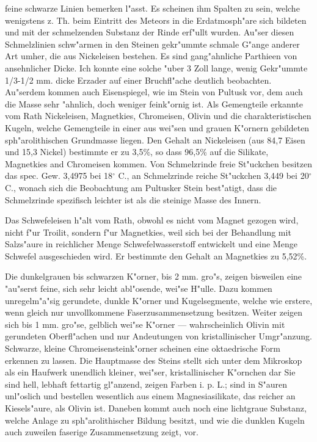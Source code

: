 \documentclass[a4paper, 11pt, oneside]{article}
\begin{document}
feine schwarze Linien bemerken l"asst. Es scheinen ihm Spalten zu sein, welche wenigstens z. Th. beim Eintritt des Meteors in die Erdatmosph"are sich bildeten und mit der schmelzenden Substanz der Rinde erf"ullt wurden. Au"ser diesen Schmelzlinien schw"armen in den Steinen gekr"ummte schmale G"ange anderer Art umher, die aus Nickeleisen bestehen. Es sind gang"ahnliche Parthieen von ansehnlicher Dicke. Ich konnte eine solche "uber 3 Zoll lange, wenig Gekr"ummte 1/3-1/2 mm. dicke Erzader auf einer Bruchfl"ache deutlich beobachten. Au"serdem kommen auch Eisenspiegel, wie im Stein von Pultusk vor, dem auch die Masse sehr "ahnlich, doch weniger feink"ornig ist. Als Gemengteile erkannte vom Rath Nickeleisen, Magnetkies, Chromeisen, Olivin und die charakteristischen Kugeln, welche Gemengteile in einer aus wei"sen und grauen K"ornern gebildeten sph"arolithischen Grundmasse liegen. Den Gehalt an Nickeleisen (aus 84,7 Eisen und 15,3 Nickel) bestimmte er zu 3,5\%, so dass 96,5\% auf die Silikate, Magnetkies and Chromeisen kommen. Von Schmelzrinde freie St"uckchen besitzen das spec. Gew. 3,4975 bei 18$^{\circ}$ C., an Schmelzrinde reiche St"uckchen 3,449 bei 20$^{\circ}$ C., wonach sich die Beobachtung am Pultusker Stein best"atigt, dass die Schmelzrinde spezifisch leichter ist als die steinige Masse des Innern.

Das Schwefeleisen h"alt vom Rath, obwohl es nicht vom Magnet gezogen wird, nicht f"ur Troilit, sondern f"ur Magnetkies, weil sich bei der Behandlung mit Salzs"aure in reichlicher Menge Schwefelwasserstoff entwickelt und eine Menge Schwefel ausgeschieden wird. Er bestimmte den Gehalt an Magnetkies zu 5,52\%.

Die dunkelgrauen bis schwarzen K"orner, bis 2 mm. gro"s, zeigen bisweilen eine "au"serst feine, sich sehr leicht abl"osende, wei"se H"ulle. Dazu kommen unregelm"a"sig gerundete, dunkle K"orner und Kugelsegmente, welche wie erstere, wenn gleich nur unvollkommene Faserzusammensetzung besitzen. Weiter zeigen sich bis 1 mm. gro"se, gelblich wei"se K"orner --- wahrscheinlich Olivin mit gerundeten Oberfl"achen und nur Andeutungen von kristallinischer Umgr"anzung. Schwarze, kleine Chromeisensteink"orner scheinen eine oktaedrische Form erkennen zu lassen. Die Hauptmasse des Steins stellt sich unter dem Mikroskop als ein Haufwerk unendlich kleiner, wei"ser, kristallinischer K"ornchen dar Sie sind hell, lebhaft fettartig gl"anzend, zeigen Farben i. p. L.; sind in S"auren unl"oslich und bestellen wesentlich aus einem Magnesiasilikate, das reicher an Kiesels"aure, als Olivin ist. Daneben kommt auch noch eine lichtgraue Substanz, welche Anlage zu sph"arolithischer Bildung besitzt, und wie die dunklen Kugeln auch zuweilen faserige Zusammensetzung zeigt, vor.
\end{document}
